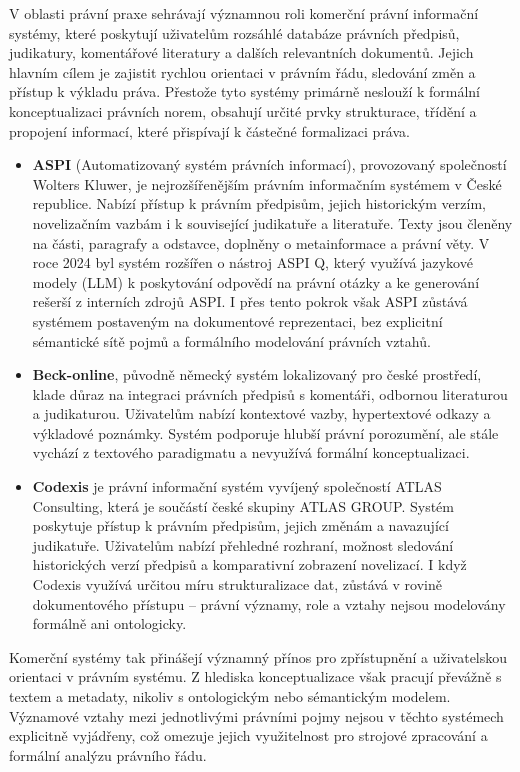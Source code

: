 V oblasti právní praxe sehrávají významnou roli komerční právní informační systémy, které poskytují uživatelům rozsáhlé databáze právních předpisů, judikatury, komentářové literatury a dalších relevantních dokumentů. Jejich hlavním cílem je zajistit rychlou orientaci v právním řádu, sledování změn a přístup k výkladu práva. Přestože tyto systémy primárně neslouží k formální konceptualizaci právních norem, obsahují určité prvky strukturace, třídění a propojení informací, které přispívají k částečné formalizaci práva.

\begin{itemize}
\item \textbf{ASPI} (Automatizovaný systém právních informací), provozovaný společností Wolters Kluwer, je nejrozšířenějším právním informačním systémem v České republice. Nabízí přístup k právním předpisům, jejich historickým verzím, novelizačním vazbám i k související judikatuře a literatuře. Texty jsou členěny na části, paragrafy a odstavce, doplněny o metainformace a právní věty. V roce 2024 byl systém rozšířen o nástroj ASPI Q, který využívá jazykové modely (LLM) k poskytování odpovědí na právní otázky a ke generování rešerší z interních zdrojů ASPI. I přes tento pokrok však ASPI zůstává systémem postaveným na dokumentové reprezentaci, bez explicitní sémantické sítě pojmů a formálního modelování právních vztahů. \cite{ASPI}

\item \textbf{Beck-online}, původně německý systém lokalizovaný pro české prostředí, klade důraz na integraci právních předpisů s komentáři, odbornou literaturou a judikaturou. Uživatelům nabízí kontextové vazby, hypertextové odkazy a výkladové poznámky. Systém podporuje hlubší právní porozumění, ale stále vychází z textového paradigmatu a nevyužívá formální konceptualizaci. \cite{BECK}

\item \textbf{Codexis} je právní informační systém vyvíjený společností ATLAS Consulting, která je součástí české skupiny ATLAS GROUP. Systém poskytuje přístup k právním předpisům, jejich změnám a navazující judikatuře. Uživatelům nabízí přehledné rozhraní, možnost sledování historických verzí předpisů a komparativní zobrazení novelizací. I když Codexis využívá určitou míru strukturalizace dat, zůstává v rovině dokumentového přístupu – právní významy, role a vztahy nejsou modelovány formálně ani ontologicky. \cite{CODEXIS}
\end{itemize}

Komerční systémy tak přinášejí významný přínos pro zpřístupnění a uživatelskou orientaci v právním systému. Z hlediska konceptualizace však pracují převážně s textem a metadaty, nikoliv s ontologickým nebo sémantickým modelem. Významové vztahy mezi jednotlivými právními pojmy nejsou v těchto systémech explicitně vyjádřeny, což omezuje jejich využitelnost pro strojové zpracování a formální analýzu právního řádu.


